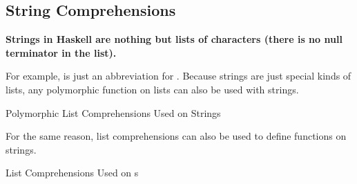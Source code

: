 \subsection{String Comprehensions}\label{subsec:String_Comprehensions}
\begin{blackbox}
  \textbf{Strings in Haskell are nothing but lists of characters (there is no null terminator in the list).}
\end{blackbox}

For example,  is just an abbreviation for \haskellinline{['a', 'b', 'c']::[Char]}.
Because strings are just special kinds of lists, any polymorphic function on lists can also be used with strings.
\begin{listing}[h!tbp]
\caption{Polymorphic List Comprehensions Used on Strings}
\label{lst:Polymorphic_List_Comprehensions_Strings}
\end{listing}

For the same reason, list comprehensions can also be used to define functions on strings.
\begin{listing}[h!tbp]
\caption{List Comprehensions Used on s}
\label{lst:String_List_Comprehensions}
\end{listing}

